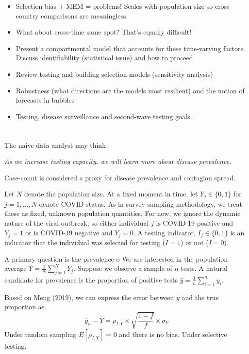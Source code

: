 \documentclass[12pt]{article}
\numberwithin{equation}{section}
\theoremstyle{plain}
\begin{document}
\begin{itemize}
	\item Selection bias + MEM = problems! Scales with population size so cross country comparisons are meaningless.
	\item What about cross-time same spot?  That's equally difficult!
	\item Present a compartmental model that accounts for these time-varying factors.  Discuss identifiability (statistical issue) and how to proceed
	\item Review testing and building selection models (sensitivity analysis)
	\item Robustness (what directions are the models most resilient) and the notion of forecasts in bubbles
	\item Testing, disease surveillance and second-wave testing goals.
\end{itemize}

\section{}

The naive data analyst may think
\begin{center}
\emph{As we increase testing capacity, we will learn more about disease prevalence.}
\end{center}

Case-count is considered a proxy for disease prevalence and contagion spread.

Let $N$ denote the population size.  At a fixed moment in time, let $Y_j \in \{ 0,1\}$ for $j=1,\ldots, N$ denote COVID status.  As in survey sampling methodology, we treat these as fixed, unknown population quantities. For now, we ignore the dynamic nature of the viral outbreak; so either individual $j$ is COVID-19 positive and $Y_j=1$ or is COVID-19 negative and $Y_j=0$. A testing indicator, $I_j \in \{0,1\}$ is an indicator that the individual was selected for testing ($I = 1$) or not ($I=0$).

A primary question is the prevalence o
We are interested in the population average $\bar Y = \frac{1}{N} \sum_{j=1}^N Y_j$. Suppose we observe a sample of $n$ tests.  A natural candidate for prevalence is the proportion of positive tests $\bar y = \frac{1}{n} \sum_{i=1}^n y_i$.

Based on Meng (2019), we can express the error between $\bar y$ and the true proportion as
$$
\bar y_n - \bar Y =  \rho_{I, Y} \times \sqrt{\frac{1-f}{f}} \times \sigma_Y
$$
Under random sampling $E [ \rho_{I,Y} ]$ = 0 and there is no bias.  Under selective testing,
\end{document}
